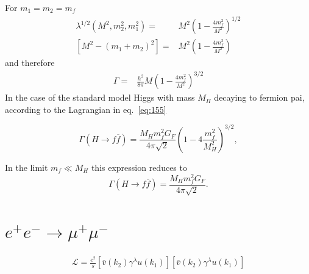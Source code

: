 For $m_1=m_2=m_f$
\begin{align}
  \lambda^{1/2}(M^2,m_2^2,m_1^2)=&M^2\left(1-\frac{4m_f^2}{M^2}\right)^{1/2}\nonumber\\
\left[M^2-(m_1+m_2)^2\right]=&M^2\left(1-\frac{4m_f^2}{M^2}\right)
\end{align}
and therefore
\begin{align}
\Gamma=&\frac{h^2}{8 \pi}M\left(1-\frac{4m_f^2}{M^2}\right)^{3/2}
\end{align}
In the case of the standard model Higgs with mass $M_H$ decaying to fermion pai, according to the Lagrangian in eq.~\eqref{eq:155}

\begin{equation}
\Gamma(H\to f\overline{f})=\frac{M_{H}m_{f}^{2}G_{F}}{4\pi\sqrt{2}}
\left(1-4\frac{m^2_{f}}{M^2_{H}}\right)^{3/2}, 
\end{equation}

In the limit $m_{f}\ll M_{H}$ this expression reduces to 
\begin{equation}
\Gamma(H\to
f\overline{f})=\frac{M_{H}m_{f}^{2}G_{F}}{4\pi\sqrt{2}}. 
\end{equation}


\section{$e^+ e^- \to \mu^+\mu^-$}

\begin{align}
  \mathcal{L}=\frac{e^2}{s}
  \left[\bar v(k_2)\gamma^\lambda u(k_1)  \right]
  \left[\bar v(k_2)\gamma^\lambda u(k_1)  \right]
\end{align}

